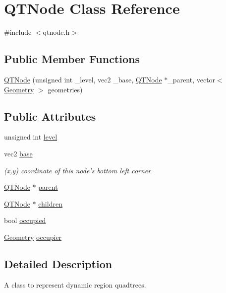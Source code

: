 \hypertarget{class_q_t_node}{\section{Q\+T\+Node Class Reference}
\label{class_q_t_node}
}


{\ttfamily \#include $<$qtnode.\+h$>$}

\subsection*{Public Member Functions}
\begin{DoxyCompactItemize}
\item 
\hyperlink{class_q_t_node_a991c8c64236bd40cda2065d4df6826ef}{Q\+T\+Node} (unsigned int \+\_\+level, vec2 \+\_\+base, \hyperlink{class_q_t_node}{Q\+T\+Node} $\ast$\+\_\+parent, vector$<$ \hyperlink{class_geometry}{Geometry} $>$ geometries)
\end{DoxyCompactItemize}
\subsection*{Public Attributes}
\begin{DoxyCompactItemize}
\item 
unsigned int \hyperlink{class_q_t_node_a40d33fe4103a3a895137cfb08c246010}{level}
\item 
vec2 \hyperlink{class_q_t_node_a81dfd9fcf4b01c740ef373c1dca38765}{base}
\begin{DoxyCompactList}\small\item\em (x,y) coordinate of this node's bottom left corner \end{DoxyCompactList}\item 
\hyperlink{class_q_t_node}{Q\+T\+Node} $\ast$ \hyperlink{class_q_t_node_a1d8821384dae11149cb108440b108176}{parent}
\item 
\hyperlink{class_q_t_node}{Q\+T\+Node} $\ast$ \hyperlink{class_q_t_node_aacf4c1618f753633cb7ea9ddb76690f9}{children}
\item 
bool \hyperlink{class_q_t_node_aaa8bd41ed3407ecad40f52659ecb84b8}{occupied}
\item 
\hyperlink{class_geometry}{Geometry} \hyperlink{class_q_t_node_aa101f25c611e27299a96f510567c9516}{occupier}
\end{DoxyCompactItemize}


\subsection{Detailed Description}
A class to represent dynamic region quadtrees. 

